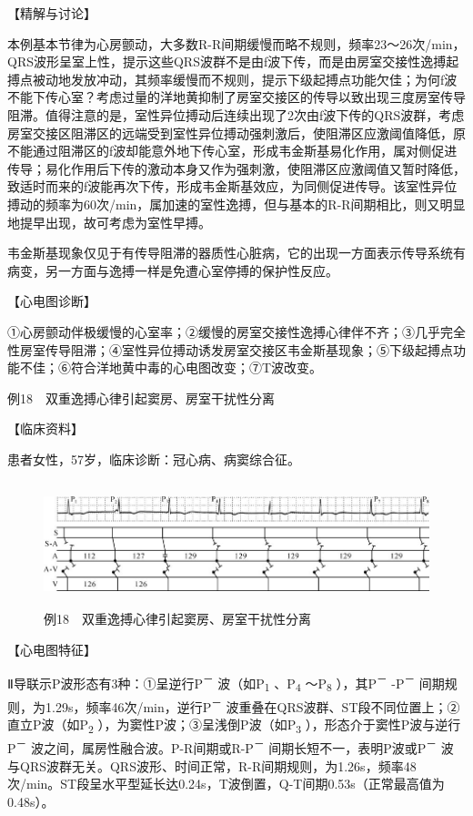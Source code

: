 【精解与讨论】

本例基本节律为心房颤动，大多数R-R间期缓慢而略不规则，频率23～26次/min，QRS波形呈室上性，提示这些QRS波群不是由f波下传，而是由房室交接性逸搏起搏点被动地发放冲动，其频率缓慢而不规则，提示下级起搏点功能欠佳；为何f波不能下传心室？考虑过量的洋地黄抑制了房室交接区的传导以致出现三度房室传导阻滞。值得注意的是，室性异位搏动后连续出现了2次由f波下传的QRS波群，考虑房室交接区阻滞区的远端受到室性异位搏动强刺激后，使阻滞区应激阈值降低，原不能通过阻滞区的f波却能意外地下传心室，形成韦金斯基易化作用，属对侧促进传导；易化作用后下传的激动本身又作为强刺激，使阻滞区应激阈值又暂时降低，致适时而来的f波能再次下传，形成韦金斯基效应，为同侧促进传导。该室性异位搏动的频率为60次/min，属加速的室性逸搏，但与基本的R-R间期相比，则又明显地提早出现，故可考虑为室性早搏。

韦金斯基现象仅见于有传导阻滞的器质性心脏病，它的出现一方面表示传导系统有病变，另一方面与逸搏一样是免遭心室停搏的保护性反应。

【心电图诊断】

①心房颤动伴极缓慢的心室率；②缓慢的房室交接性逸搏心律伴不齐；③几乎完全性房室传导阻滞；④室性异位搏动诱发房室交接区韦金斯基现象；⑤下级起搏点功能不佳；⑥符合洋地黄中毒的心电图改变；⑦T波改变。

例18　双重逸搏心律引起窦房、房室干扰性分离

【临床资料】

患者女性，57岁，临床诊断：冠心病、病窦综合征。

\begin{figure}[!htbp]
 \centering
 \includegraphics[width=5.80208in,height=1.42708in]{./images/Image00776.jpg}
 \captionsetup{justification=centering}
 \caption{例18　双重逸搏心律引起窦房、房室干扰性分离}
 \label{fig50-18}
  \end{figure} 

【心电图特征】

Ⅱ导联示P波形态有3种：①呈逆行P\textsuperscript{－}
波（如P\textsubscript{1} 、P\textsubscript{4} ～P\textsubscript{8}
），其P\textsuperscript{－} -P\textsuperscript{－}
间期规则，为1.29s，频率46次/min，逆行P\textsuperscript{－}
波重叠在QRS波群、ST段不同位置上；②直立P波（如P\textsubscript{2}
），为窦性P波；③呈浅倒P波（如P\textsubscript{3}
），形态介于窦性P波与逆行P\textsuperscript{－}
波之间，属房性融合波。P-R间期或R-P\textsuperscript{－}
间期长短不一，表明P波或P\textsuperscript{－}
波与QRS波群无关。QRS波形、时间正常，R-R间期规则，为1.26s，频率48次/min。ST段呈水平型延长达0.24s，T波倒置，Q-T间期0.53s（正常最高值为0.48s）。

